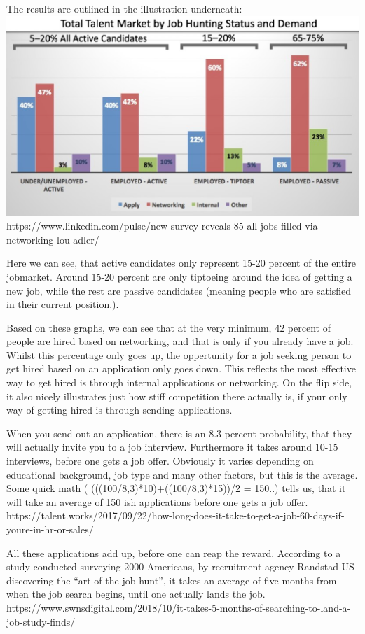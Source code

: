 The results are outlined in the illustration underneath:
\includegraphics{figures/hiringpeople.bmp}
https://www.linkedin.com/pulse/new-survey-reveals-85-all-jobs-filled-via-networking-lou-adler/

Here we can see, that active candidates only represent 15-20 percent of the
entire jobmarket. Around 15-20 percent are only tiptoeing around the idea
of getting a new job, while the rest are passive candidates (meaning people who are
satisfied in their current position.).

Based on these graphs, we can see that at the very minimum, 42 percent of people are
hired based on networking, and that is only if you already have a job.
Whilst this percentage only goes up, the oppertunity for a job seeking person
to get hired based on an application only goes down. This reflects the
most effective way to get hired is through internal applications or networking.
On the flip side, it also nicely illustrates just how stiff competition there actually is,
if your only way of getting hired is through sending applications.

When you send out an application, there is an 8.3 percent probability, that
they will actually invite you to a job interview. Furthermore it takes around
10-15 interviews, before one gets a job offer. Obviously it varies depending
on educational background, job type and many other factors, but this is the average.
Some quick math ( (((100/8,3)*10)+((100/8,3)*15))/2 = 150..) tells us, that it will
take an average of 150 ish applications before one gets a job offer.
https://talent.works/2017/09/22/how-long-does-it-take-to-get-a-job-60-days-if-youre-in-hr-or-sales/

All these applications add up, before one can reap the reward. According to a
study conducted surveying 2000 Americans, by recruitment agency Randstad US
discovering the “art of the job hunt”, it takes an average of five
months from when the job search begins, until one actually lands
the job.
https://www.swnsdigital.com/2018/10/it-takes-5-months-of-searching-to-land-a-job-study-finds/

